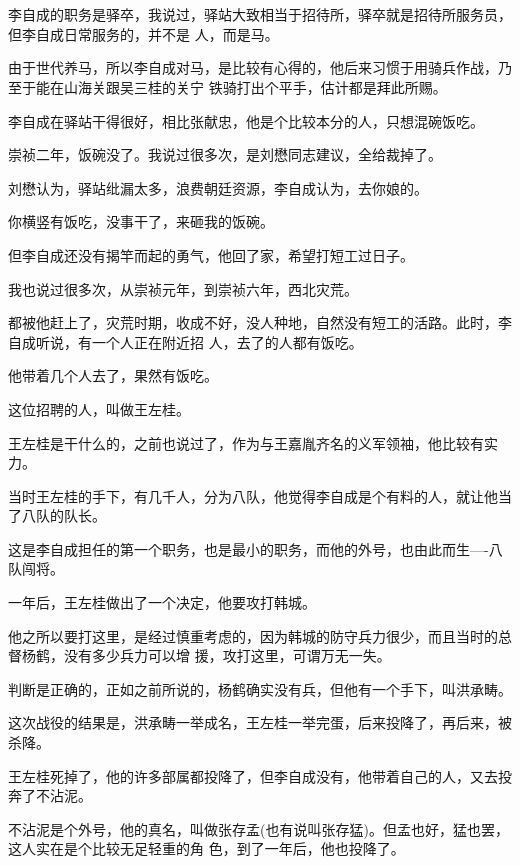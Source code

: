 \documentclass[11pt,a4paper,onecolumn]{article}
\begin{document}
\section[\thesection]{}

李自成的职务是驿卒，我说过，驿站大致相当于招待所，驿卒就是招待所服务员，但李自成日常服务的，并不是
人，而是马。

由于世代养马，所以李自成对马，是比较有心得的，他后来习惯于用骑兵作战，乃至于能在山海关跟吴三桂的关宁
铁骑打出个平手，估计都是拜此所赐。

李自成在驿站干得很好，相比张献忠，他是个比较本分的人，只想混碗饭吃。

崇祯二年，饭碗没了。我说过很多次，是刘懋同志建议，全给裁掉了。

刘懋认为，驿站纰漏太多，浪费朝廷资源，李自成认为，去你娘的。

你横竖有饭吃，没事干了，来砸我的饭碗。

但李自成还没有揭竿而起的勇气，他回了家，希望打短工过日子。

我也说过很多次，从崇祯元年，到崇祯六年，西北灾荒。

都被他赶上了，灾荒时期，收成不好，没人种地，自然没有短工的活路。此时，李自成听说，有一个人正在附近招
人，去了的人都有饭吃。

他带着几个人去了，果然有饭吃。

这位招聘的人，叫做王左桂。

王左桂是干什么的，之前也说过了，作为与王嘉胤齐名的义军领袖，他比较有实力。

当时王左桂的手下，有几千人，分为八队，他觉得李自成是个有料的人，就让他当了八队的队长。

这是李自成担任的第一个职务，也是最小的职务，而他的外号，也由此而生----八队闯将。

一年后，王左桂做出了一个决定，他要攻打韩城。

他之所以要打这里，是经过慎重考虑的，因为韩城的防守兵力很少，而且当时的总督杨鹤，没有多少兵力可以增
援，攻打这里，可谓万无一失。

判断是正确的，正如之前所说的，杨鹤确实没有兵，但他有一个手下，叫洪承畴。

这次战役的结果是，洪承畴一举成名，王左桂一举完蛋，后来投降了，再后来，被杀降。

王左桂死掉了，他的许多部属都投降了，但李自成没有，他带着自己的人，又去投奔了不沾泥。

不沾泥是个外号，他的真名，叫做张存孟(也有说叫张存猛)。但孟也好，猛也罢，这人实在是个比较无足轻重的角
色，到了一年后，他也投降了。
\end{document}
